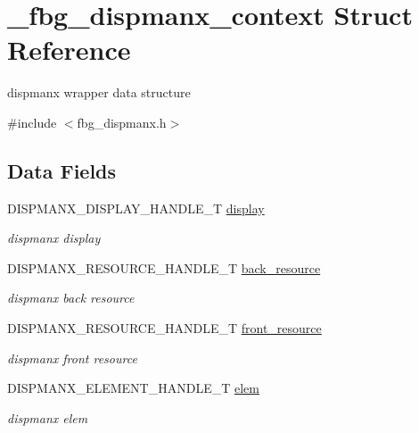\hypertarget{struct__fbg__dispmanx__context}{}\section{\+\_\+fbg\+\_\+dispmanx\+\_\+context Struct Reference}
\label{struct__fbg__dispmanx__context}


dispmanx wrapper data structure  




{\ttfamily \#include $<$fbg\+\_\+dispmanx.\+h$>$}

\subsection*{Data Fields}
\begin{DoxyCompactItemize}
\item 
D\+I\+S\+P\+M\+A\+N\+X\+\_\+\+D\+I\+S\+P\+L\+A\+Y\+\_\+\+H\+A\+N\+D\+L\+E\+\_\+T \hyperlink{struct__fbg__dispmanx__context_a9263fa3b9088feba4becb5488f3a27ee}{display}
\begin{DoxyCompactList}\small\item\em dispmanx display \end{DoxyCompactList}\item 
D\+I\+S\+P\+M\+A\+N\+X\+\_\+\+R\+E\+S\+O\+U\+R\+C\+E\+\_\+\+H\+A\+N\+D\+L\+E\+\_\+T \hyperlink{struct__fbg__dispmanx__context_a4e5395ea92a73ef0db5048824c7df710}{back\+\_\+resource}
\begin{DoxyCompactList}\small\item\em dispmanx back resource \end{DoxyCompactList}\item 
D\+I\+S\+P\+M\+A\+N\+X\+\_\+\+R\+E\+S\+O\+U\+R\+C\+E\+\_\+\+H\+A\+N\+D\+L\+E\+\_\+T \hyperlink{struct__fbg__dispmanx__context_acfd61d15e712eb715bb99ff4c6ec1dc7}{front\+\_\+resource}
\begin{DoxyCompactList}\small\item\em dispmanx front resource \end{DoxyCompactList}\item 
D\+I\+S\+P\+M\+A\+N\+X\+\_\+\+E\+L\+E\+M\+E\+N\+T\+\_\+\+H\+A\+N\+D\+L\+E\+\_\+T \hyperlink{struct__fbg__dispmanx__context_ab18b7173ed0ff6e670068041cf0779e9}{elem}
\begin{DoxyCompactList}\small\item\em dispmanx elem \end{DoxyCompactList}\item 

\end{DoxyCompactItemize}
